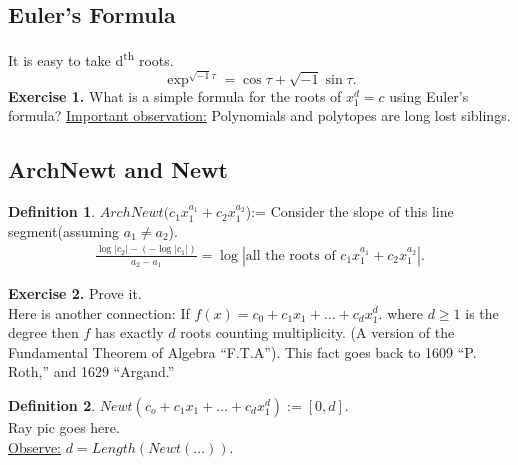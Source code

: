 \documentclass[]{article}
\theoremstyle{definition}
\newtheorem*{defn}{Definition}
\begin{document}
			\subsection{Euler's Formula}
			It is easy to take d\textsuperscript{th} roots.
			\[ \exp^{\sqrt{-1}\tau}= \cos\tau+\sqrt{-1}\sin\tau.\]
			\textbf{Exercise 1.}
			What is a simple formula for the roots of $x_1^{d}=c$ using Euler's formula?
			\underline{Important observation:} Polynomials and polytopes are long lost siblings.
			\subsection{ArchNewt and Newt}
			\begin{defn}
			$ArchNewt(c_1x_1^{a_1}+c_2x_1^{a_2}$):=
			Consider the slope of this line segment(assuming $a_1\neq a_2$).
			\begin{align*}
			\frac{\log|c_2|-(-\log|c_1|)}{a_2-a_1} = \log\left| \text{all the roots of } c_1x_1^{a_1}+c_2x_1^{a_2}\right|.
			\end{align*}
			\end{defn}
			\textbf{Exercise 2.} Prove it.\\
			
			Here is another connection: If $f(x)=c_0+c_1x_1+\ldots+c_dx_1^d.$ where $d\geq1$ is the degree then $f$ has exactly $d$ roots counting multiplicity. (A version of the Fundamental Theorem of Algebra ``F.T.A'').
			This fact goes back to 1609 ``P. Roth,'' and 1629 ``Argand.''
			\begin{defn}
			$Newt(c_o+c_1x_1+\ldots+c_dx_1^{d}):= [0,d].$
			\\
			Ray pic goes here.\\
			
			\underline{Observe:} $d=Length(Newt(\ldots))$.
			\end{defn}
\end{document}
